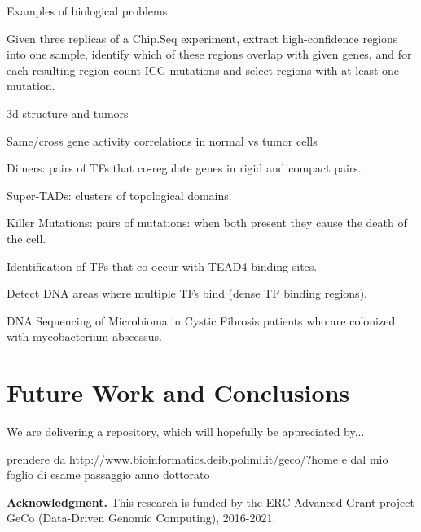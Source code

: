 \documentclass[conference]{IEEEtran}
\begin{document}
Examples of biological problems

Given three replicas of a Chip.Seq experiment, extract high-confidence regions into one sample, identify which of these regions overlap with given genes, and for each resulting region count ICG mutations and select regions with at least one mutation.

3d structure and tumors

Same/cross gene activity correlations in normal vs tumor cells

Dimers: pairs of TFs that co-regulate genes in rigid and compact pairs.

Super-TADs: clusters of topological domains.

Killer Mutations: pairs of mutations: when both present they cause the death of the cell.

Identification of TFs that co-occur with TEAD4 binding sites.

Detect DNA areas where multiple TFs bind (dense TF binding regions).

DNA Sequencing of Microbioma in Cystic Fibrosis patients who are colonized with mycobacterium abscessus.



\section{Future Work and Conclusions}
We are delivering a repository, which will hopefully be appreciated by...


\cite{bernasconi2017conceptual}


prendere da http://www.bioinformatics.deib.polimi.it/geco/?home
e dal mio foglio di esame passaggio anno dottorato

{\bf Acknowledgment.} This research is funded by the ERC Advanced Grant project GeCo (Data-Driven Genomic Computing), 2016-2021.


 
\end{document}
